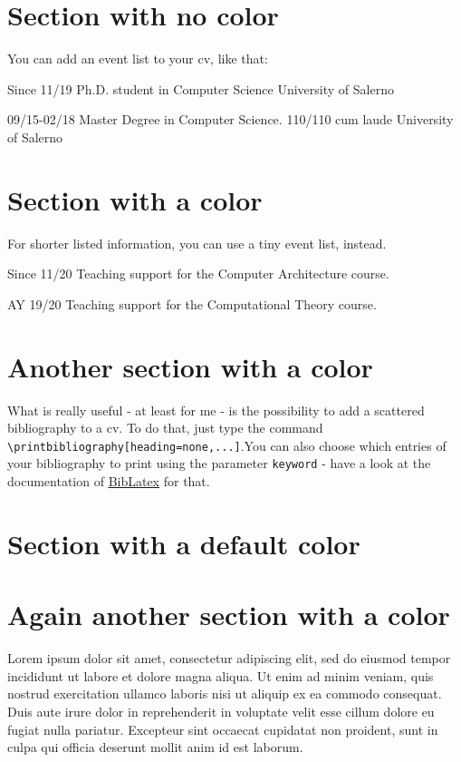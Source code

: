 \documentclass{alecs}
\begin{document}
\section[nocolor]{Section with no color}
You can add an event list to your cv, like that:

\begin{eventlist}
	\event  
	{Since 11/19}
	{Ph.D. student in Computer Science}
	{University of Salerno}
	{}
	
	\event  
	{09/15-02/18}
	{Master Degree in Computer Science.}
	{110/110 cum laude}
	{University of Salerno}
\end{eventlist}


\section[]{Section with a color}
For shorter listed information, you can use a tiny event list, instead.

\begin{tinyeventlist}
	\tinyevent
	{Since 11/20}
	{Teaching support for the Computer Architecture course.}
	
	\tinyevent  
	{AY 19/20}
	{Teaching support for the Computational Theory course.}
\end{tinyeventlist}


\section[]{Another section with a color}
What is really useful - at least for me - is the possibility to add a scattered bibliography to a cv. To do that, just type the command \texttt{\textbackslash printbibliography[heading=none,...]}.You can also choose which entries of your bibliography to print using the parameter \texttt{keyword} - have a look at the documentation of \href{https://ctan.mirror.garr.it/mirrors/ctan/macros/latex/contrib/biblatex/doc/biblatex.pdf}{\underline{BibLatex}} for that.

\printbibliography[heading=none,keyword=key1]


\section[defaultcolor]{Section with a default color}
\printbibliography[heading=none,keyword=key2]


\section[]{Again another section with a color}
Lorem ipsum dolor sit amet, consectetur adipiscing elit, sed do eiusmod tempor incididunt ut labore et dolore magna aliqua. Ut enim ad minim veniam, quis nostrud exercitation ullamco laboris nisi ut aliquip ex ea commodo consequat. Duis aute irure dolor in reprehenderit in voluptate velit esse cillum dolore eu fugiat nulla pariatur. Excepteur sint occaecat cupidatat non proident, sunt in culpa qui officia deserunt mollit anim id est laborum.
\end{document}
